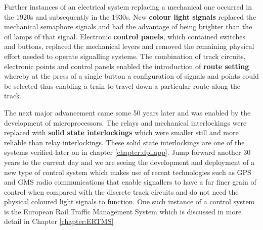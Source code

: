 Further instances of an electrical system replacing a mechanical one occurred in the 1920s and subsequently in the 1930s. New \textbf{colour light signals} replaced  the mechanical semaphore signals and had the advantage of being brighter than the oil lamps of that signal.
Electronic \textbf{control panels}, which contained switches and buttons, replaced the mechanical levers and removed the remaining physical effort needed to operate signalling systems. The combination of track circuits, electronic points and control panels enabled the introduction of \textbf{route setting} whereby at the press of a single button a configuration of signals and points could be selected thus enabling a train to travel down a particular route along the track.

The next major advancement came some 50 years later and was enabled by the development of microprocessors. The relays and mechanical interlockings were replaced with \textbf{solid state interlockings} which were smaller still and more reliable than relay interlockings.
These solid state interlockings are one of the systems verified later on in chapter \ref{chapter:dpllapp}. Jump forward another 30 years to the current day and we are seeing the development and deployment of a new type of control system which makes use of recent technologies such as GPS and GMS radio  communications that enable signallers to have a far finer grain of control when compared with the discrete track circuits and do not need the physical coloured light signals to function. One such instance of a control system is the European Rail Traffic Management System which is discussed in more detail in Chapter \ref{chapter:ERTMS}
\begin{comment}
In the 1920s \textbf{colour light signals} replaced mechanical semaphore signals these where much brighter than the oil
lamps fitted to semaphores and greatly increased the safety of night time
train travel. In the 1930s the mechanical levers were replaced with an electronic \textbf{control panel}
containing switches and buttons. This allowed for the introduction of
\textbf{route setting} where with the press of a button configurations of signals and points would be
associated with a particular route could become activated. Prior to this time
many levers would have had to have been pulled to set many different pieces of equipment.
During the 1980s the most important advance from our point of view took
place. The advent of electronic microprocessors enabled the replacement of the
relay and mechanical interlockings with an electronic \textbf{solid state interlocking}
system (SSI) \cite{AC08}. The main focus of this project will be to investigate the safety
of such solid state interlockings.
\end{comment}
